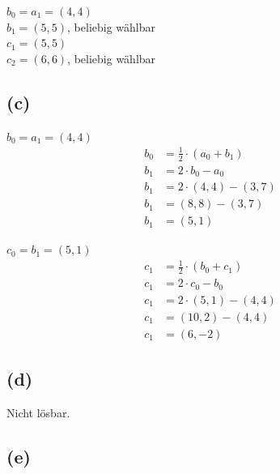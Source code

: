 \documentclass{article}
\begin{document}

$b_0 = a_1 = (4,4)$ \\
$b_1 = (5,5)$, beliebig wählbar \\
$c_1 = (5,5)$ \\
$c_2 = (6,6)$, beliebig wählbar \\

\subsection*{(c)}
$b_0 = a_1 = (4,4)$ \\
\[
    \begin{aligned}
        b_0 &= \frac{1}{2} \cdot (a_0 + b_1) \\
        b_1 &= 2 \cdot b_0 - a_0 \\
        b_1 &= 2 \cdot (4,4) - (3,7) \\
        b_1 &= (8,8) - (3,7) \\
        b_1 &= (5,1)
    \end{aligned}
\]

$c_0 = b_1 = (5,1)$ \\
\[
    \begin{aligned}
        c_1 &= \frac{1}{2} \cdot (b_0 + c_1) \\
        c_1 &= 2 \cdot c_0 - b_0 \\
        c_1 &= 2 \cdot (5,1) - (4,4) \\
        c_1 &= (10,2) - (4,4) \\
        c_1 &= (6,-2)
    \end{aligned}
\]

\subsection*{(d)}
Nicht lösbar.

\subsection*{(e)}
\end{document}
